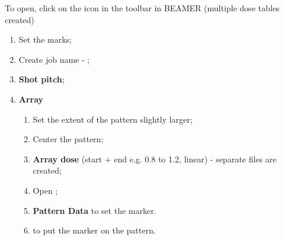 To  open,  click on  the  icon  in  the toolbar  in  BEAMER  (multiple dose  tables  created)
 \begin{enumerate}
 \item Set the marks;
 \item Create job name - ;
 \item \textbf{Shot pitch};
 \item \textbf{Array}
   \begin{enumerate}
   \item Set the extent of the pattern slightly larger;
   \item Center the pattern;
   \item \textbf{Array  dose} (start  + end e.g.   0.8 to 1.2,  linear) -  separate 
     files are created;
   \item Open ;
   \item \textbf{Pattern Data} to set the marker.
   \item {} to put the marker on the pattern.
   \end{enumerate}
 \end{enumerate}

 \newpage
